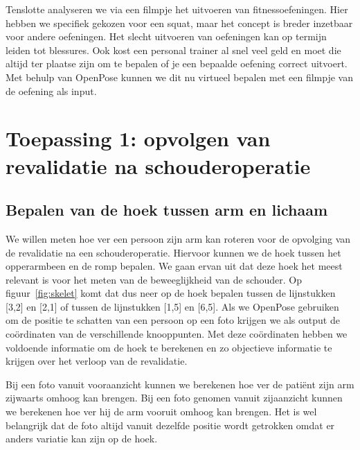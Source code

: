 \documentclass[a4paper,twoside,kulak]{kulakreport}
\begin{document}
Tenslotte analyseren we via een filmpje het uitvoeren van fitnessoefeningen. Hier hebben we specifiek gekozen voor een squat, maar het concept is breder inzetbaar voor andere oefeningen. Het slecht uitvoeren van oefeningen kan op termijn leiden tot blessures. Ook kost een personal trainer al snel veel geld en moet die altijd ter plaatse zijn om te bepalen of je een bepaalde oefening correct uitvoert. Met behulp van OpenPose kunnen we dit nu virtueel bepalen met een filmpje van de oefening als input.

\section{Toepassing 1: opvolgen van revalidatie na schouderoperatie}
\subsection{Bepalen van de hoek tussen arm en lichaam}

We willen meten hoe ver een persoon zijn arm kan roteren voor de opvolging van de revalidatie na een schouderoperatie. Hiervoor kunnen we de hoek tussen het opperarmbeen en de romp bepalen. We gaan ervan uit dat deze hoek het meest relevant is voor het meten van de beweeglijkheid van de schouder. Op figuur~\ref{fig:skelet} komt dat dus neer op de hoek bepalen tussen de lijnstukken [3,2] en [2,1] of tussen de lijnstukken [1,5] en [6,5]. Als we OpenPose gebruiken om de positie te schatten van een persoon op een foto krijgen we als output de coördinaten van de verschillende knooppunten. Met deze coördinaten hebben we voldoende informatie om de hoek te berekenen en zo objectieve informatie te krijgen over het verloop van de revalidatie.

Bij een foto vanuit vooraanzicht kunnen we berekenen hoe ver de patiënt zijn arm zijwaarts omhoog kan brengen. Bij een foto genomen vanuit zijaanzicht kunnen we berekenen hoe ver hij de arm vooruit omhoog kan brengen. Het is wel belangrijk dat de foto altijd vanuit dezelfde positie wordt getrokken omdat er anders variatie kan zijn op de hoek.
\end{document}

